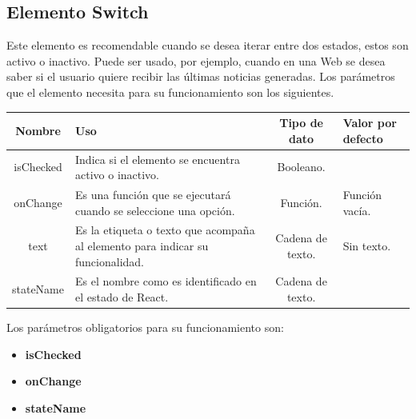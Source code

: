 \subsection{Elemento Switch}
Este elemento es recomendable cuando se desea iterar entre dos estados, estos son activo o inactivo. Puede ser usado, por ejemplo, cuando en una Web se desea saber si el usuario quiere recibir las últimas noticias generadas.
Los parámetros que el elemento necesita para su funcionamiento son los siguientes.
\newline
    \newline
    \begin{center}
     \begin{tabular}{ | c |  p{5cm}  | c | p{3cm} |} 
     \hline
     \textbf{Nombre} &  \textbf{Uso} &  \textbf{ Tipo de dato} &  \textbf{Valor por defecto}\\ [0.5ex] 
     \hline\hline
     isChecked &  Indica si el elemento se encuentra activo o inactivo. &   Booleano. & \\  [2.5ex] 
     \hline
     onChange &  Es una función que se ejecutará cuando se seleccione una opción. &   Función. & Función vacía. \\  [2.5ex] 
     \hline
     text &  Es la etiqueta o texto que acompaña al elemento para indicar su funcionalidad. &   Cadena de texto. & Sin texto. \\  [2.5ex] 
     \hline
     stateName &  Es el nombre como es identificado en el estado de React. &  Cadena de texto. & \\  [2.5ex] 
     \hline
    \end{tabular}
    \end{center}
    \newline
        \newline
Los parámetros obligatorios para su funcionamiento son:
\begin{itemize}
\item \textbf{isChecked} 
\item \textbf{onChange} 
\item \textbf{stateName} 
\end{itemize}
\newline
    \newline
